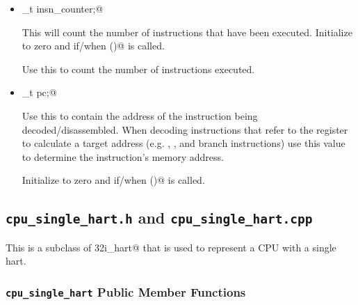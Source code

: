 \documentclass{article}
\begin{document}
\begin{itemize}
\item {}_t insn_counter;@

This will count the number of instructions that have been executed.
Initialize to zero and if/when \verb@reset()@ is called.

Use this to count the number of instructions executed.


\item {}_t pc;@

Use this to contain the address of the instruction being decoded/disassembled.
When decoding instructions that refer to the \verb@pc@ register to calculate 
a target address (e.g. \verb@auipc@, \verb@jal@, and branch instructions)
use this value to determine the instruction's memory address.

Initialize to zero and if/when \verb@reset()@ is called.

\end{itemize}









\subsection{{\tt cpu\_single\_hart.h} and {\tt cpu\_single\_hart.cpp}}

This is a subclass of \verb@rv32i_hart@ that is used to represent a CPU with
a single hart.

\subsubsection{{\tt cpu\_single\_hart} Public Member Functions}
\end{document}
